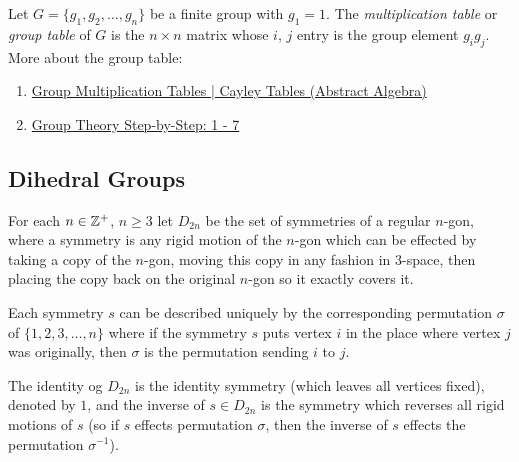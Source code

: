 {Let $G=\{g_{1},g_{2},\dots,g_{n}\}$ be a finite group with $g_{1} = 1$.
The {\sl multiplication table} or {\sl group table} of $G$ is the $n\times n$ matrix
whose $i$, $j$ entry is the group element $g_{i}g_{j}$.
}
More about the group table:
\begin{enumerate}[leftmargin=20pt, itemsep=0pt, topsep=0pt]
    \item \href{https://youtu.be/BwHspSCXFNM?si=1ucTvpLN6bGUYX9v}{Group Multiplication Tables | Cayley Tables (Abstract Algebra)}
    \item \href{https://youtu.be/tGCqP2ytP14?si=3P4tafGvrpjJWQyd}{Group Theory Step-by-Step: 1 - 7}
\end{enumerate}

\newpage
\thispagestyle{evenpagestyle}
\subsection{Dihedral Groups}
For each $n\in \mathbb{Z}^{+}$, $n\ge 3$ let $D_{2n}$ be the set of symmetries
of a regular $n$-gon, where a symmetry is any rigid motion of the $n$-gon which can
be effected by taking a copy of the $n$-gon, moving this copy in any fashion in $3$-space,
then placing the copy back on the original $n$-gon so it exactly covers it.

Each symmetry $s$ can be described uniquely by the corresponding permutation $\sigma$
of $\{1,2,3,\dots,n\}$ where if the symmetry $s$ puts vertex $i$ in the place where vertex $j$
was originally, then $\sigma$ is the permutation sending $i$ to $j$.

The identity og $D_{2n}$ is the identity symmetry (which leaves all vertices fixed), denoted by $1$,
and the inverse of $s\in D_{2n}$ is the symmetry which reverses all rigid motions of $s$
(so if $s$ effects permutation $\sigma$, then the inverse of $s$ effects the permutation $\sigma^{-1}$).

